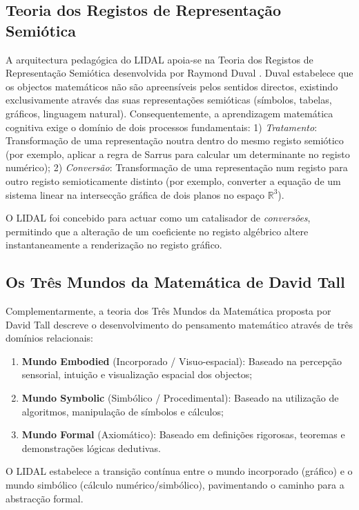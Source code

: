\documentclass[conference]{IEEEtran}
\begin{document}
\subsection{Teoria dos Registos de Representação Semiótica}

A arquitectura pedagógica do LIDAL apoia-se na Teoria dos Registos de Representação Semiótica desenvolvida por Raymond Duval \cite{duval1995}. Duval estabelece que os objectos matemáticos não são apreensíveis pelos sentidos directos, existindo exclusivamente através das suas representações semióticas (símbolos, tabelas, gráficos, linguagem natural). Consequentemente, a aprendizagem matemática cognitiva exige o domínio de dois processos fundamentais: 1) \textit{Tratamento}: Transformação de uma representação noutra dentro do mesmo registo semiótico (por exemplo, aplicar a regra de Sarrus para calcular um determinante no registo numérico); 2) \textit{Conversão}: Transformação de uma representação num registo para outro registo semioticamente distinto (por exemplo, converter a equação de um sistema linear na intersecção gráfica de dois planos no espaço $\mathbb{R}^3$).

O LIDAL foi concebido para actuar como um catalisador de \textit{conversões}, permitindo que a alteração de um coeficiente no registo algébrico altere instantaneamente a renderização no registo gráfico.

\subsection{Os Três Mundos da Matemática de David Tall}

Complementarmente, a teoria dos Três Mundos da Matemática proposta por David Tall \cite{tall2004} descreve o desenvolvimento do pensamento matemático através de três domínios relacionais:

\begin{enumerate}
  \item \textbf{Mundo Embodied} (Incorporado / Visuo-espacial): Baseado na percepção sensorial, intuição e visualização espacial dos objectos;
  \item \textbf{Mundo Symbolic} (Simbólico / Procedimental): Baseado na utilização de algoritmos, manipulação de símbolos e cálculos;
  \item \textbf{Mundo Formal} (Axiomático): Baseado em definições rigorosas, teoremas e demonstrações lógicas dedutivas.
\end{enumerate}

O LIDAL estabelece a transição contínua entre o mundo incorporado (gráfico) e o mundo simbólico (cálculo numérico/simbólico), pavimentando o caminho para a abstracção formal.
\end{document}
